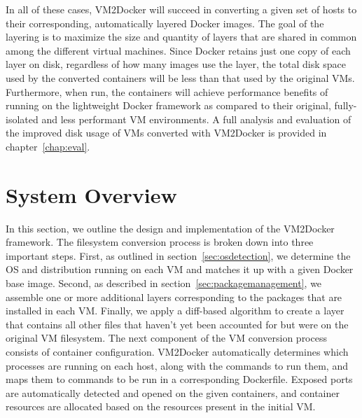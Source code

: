 In all of these cases, VM2Docker will succeed in converting a given set of hosts to their corresponding, automatically layered Docker images. The goal of the layering is to maximize the size and quantity of layers that are shared in common among the different virtual machines. Since Docker retains just one copy of each layer on disk, regardless of how many images use the layer, the total disk space used by the converted containers will be less than that used by the original VMs. Furthermore, when run, the containers will achieve performance benefits of running on the lightweight Docker framework as compared to their original, fully-isolated and less performant VM environments. A full analysis and evaluation of the improved disk usage of VMs converted with VM2Docker is provided in chapter~\ref{chap:eval}.

\section{System Overview}
\label{sec:sysoverview}
In this section, we outline the design and implementation of the VM2Docker framework. The filesystem conversion process is broken down into three important steps. First, as outlined in section~\ref{sec:osdetection}, we determine the OS and distribution running on each VM and matches it up with a given Docker base image. Second, as described in section~\ref{sec:packagemanagement}, we assemble one or more additional layers corresponding to the packages that are installed in each VM. Finally, we apply a diff-based algorithm to create a layer that contains all other files that haven't yet been accounted for but were on the original VM filesystem. The next component of the VM conversion process consists of container configuration. VM2Docker automatically determines which processes are running on each host, along with the commands to run them, and maps them to commands to be run in a corresponding Dockerfile. Exposed ports are automatically detected and opened on the given containers, and container resources are allocated based on the resources present in the initial VM.

